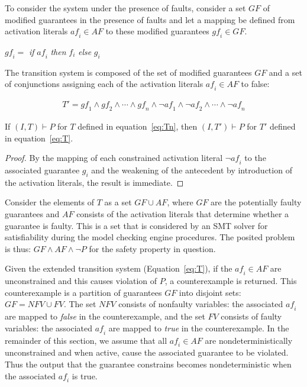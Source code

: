 To consider the system under the presence of faults, consider a set $GF$ of modified guarantees in the presence of faults and let a mapping be defined from activation literals $\mathit{af}_i \in AF$ to these modified guarantees $\mathit{gf}_i \in GF$. 
\begin{center}
$\mathit{gf}_i =$ \textit{if} $\mathit{af}_i$ \textit{then} $f_i$ \textit{else} $g_i$\\
\label{eq:sigma}
\end{center}

The transition system is composed of the set of modified guarantees $GF$ and a set of conjunctions assigning each of the activation literals $\mathit{af}_i \in AF$ to false: 

\begin{gather}
T' = \mathit{gf}_1 \land \mathit{gf}_2 \land \cdots \land \mathit{gf}_n \land \neg \mathit{af}_1 \land \neg \mathit{af}_2 \land \cdots \land \neg \mathit{af}_n
\label{eq:T}
\end{gather}

\begin{theorem} If $(I,T) \vdash P$ for $T$ defined in equation~\ref{eq:Tn}, then $(I,T') \vdash P$ for $T'$ defined in equation~\ref{eq:T}.
\begin{proof}
By the mapping of each constrained activation literal $\neg \mathit{af}_i$ to the associated guarantee $g_i$ and the weakening of the antecedent by introduction of the activation literals, the result is immediate.
\end{proof}
\end{theorem}

Consider the elements of $T$ as a set $GF \cup AF$, where $GF$ are the potentially faulty guarantees and $AF$ consists of the activation literals that determine whether a guarantee is faulty. This is a set that is considered by an SMT solver for satisfiability during the model checking engine procedures. The posited problem is thus: $GF \land AF \land \neg P$ for the safety property in question. 

Given the extended transition system (Equation~\ref{eq:T}), if the $\mathit{af}_i \in \mathit{AF}$ are unconstrained and this causes violation of $P$, a counterexample is returned. This counterexample is a partition of guarantees $\mathit{GF}$ into disjoint sets:  $\mathit{GF} = \mathit{NFV} \cup \mathit{FV}$. The set $\mathit{NFV}$ consists of nonfaulty variables: the associated $\mathit{af}_i$ are mapped to {\em false} in the counterexample, and the set $\mathit{FV}$ consists of faulty variables: the associated $\mathit{af}_i$ are mapped to {\em true} in the counterexample. In the remainder of this section, we assume that all $\mathit{af}_i \in \mathit{AF}$ are nondeterministically unconstrained and when active, cause the associated guarantee to be violated. Thus the output that the guarantee constrains becomes nondeterministic when the associated $\mathit{af}_i$ is true.


